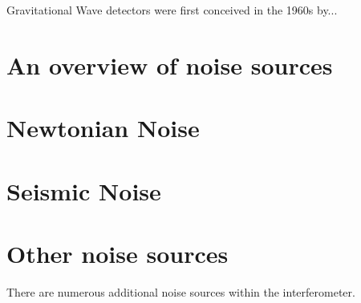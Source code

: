 \documentclass{kentigern}
\begin{document}

Gravitational Wave detectors were first conceived in the 1960s by...

\section{An overview of noise sources}
\label{sec:an-overview-noise}

\section{Newtonian Noise}
\label{sec:newtonian-noise}

\section{Seismic Noise}
\label{sec:seismic-noise}

\section{Other noise sources}
\label{sec:other-noise-sources}

There are numerous additional noise sources within the interferometer.

\glsaddall
{}
\printglossaries
\end{document}
